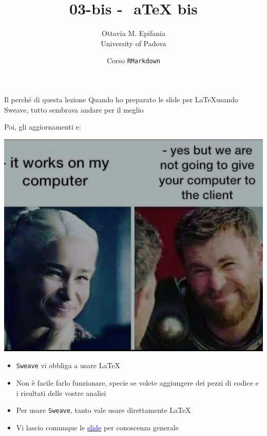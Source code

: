 \documentclass[
  ignorenonframetext,
]{beamer}
\title{03-bis -  aTeX bis}
\author{Ottavia M. Epifania\\
University of Padova}
\date{Corso \texttt{RMarkdown}}
\institute{\href{mailto:ottavia.epifania@unipd.it}{\nolinkurl{ottavia.epifania@unipd.it}}}
\begin{document}
\frame{\titlepage}

\begin{frame}{Il perché di questa lezione}
\protect\hypertarget{il-perchuxe9-di-questa-lezione}{}
Quando ho preparato le slide per \LaTeX usando Sweave, tutto sembrava
andare per il meglio

\pause

Poi, gli aggiornamenti e:

\begin{center}\includegraphics[width=0.5\linewidth]{img/meme} \end{center}
\end{frame}

\begin{frame}[fragile]{}
\protect\hypertarget{section}{}
\begin{itemize}
\item
  \texttt{Sweave} vi obbliga a usare \LaTeX
\item
  Non è facile farlo funzionare, specie se volete aggiungere dei pezzi
  di codice e i risultati delle vostre analisi
\item
  Per usare \texttt{Sweave}, tanto vale usare direttamente \LaTeX
\item
  Vi lascio comunque le
  \href{https://ottaviae.github.io/CorsoRmarkdown/slides/03\%20-\%20LaTeX/03-LaTeX.pdf}{\textcolor{blue}{slide}}
  per conoscenza generale
\end{itemize}
\end{frame}
\end{document}
